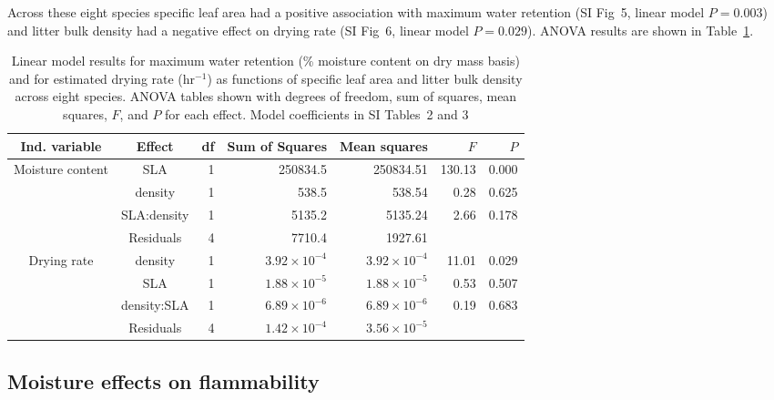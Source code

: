 \documentclass[letterpaper,12pt]{article}
\begin{document}
Across these eight species specific leaf area had a positive association with maximum
water retention (SI Fig~5, linear model $P = 0.003$) and litter
bulk density had a negative effect on drying rate (SI Fig~6,
linear model $P = 0.029$). ANOVA results are shown in Table~\ref{tab:mc_di_anova}.

\begin{table}[h]
  \caption{Linear model results for maximum water retention (\% moisture
    content on dry mass basis) and for estimated drying rate (hr$^{-1}$) as
    functions of specific leaf area and litter bulk density across eight
    species. ANOVA tables shown with degrees of freedom, sum of squares, mean
    squares, $F$, and $P$ for each effect. Model coefficients in SI Tables~2 and 3}
  \label{tab:mc_di_anova}
\centering

\begin{tabular}{ccrrrrr}
  \toprule
Ind. variable & Effect & df & Sum of Squares & Mean squares & $F$ & $P$ \\ 
  \midrule
Moisture content & SLA & 1 & 250834.5 & 250834.51 & 130.13 & 0.000 \\ 
  & density & 1 & 538.5 & 538.54 & 0.28 & 0.625 \\ 
  & SLA:density & 1 & 5135.2 & 5135.24 & 2.66 & 0.178 \\ 
  & Residuals & 4 & 7710.4 & 1927.61 &  &  \\ 
  \midrule
  
Drying rate & density & 1 & $3.92 \times 10^{-4}$ & $3.92 \times 10^{-4}$ & 11.01 & 0.029 \\ 
 &  SLA & 1 & $1.88 \times 10^{-5}$ & $1.88 \times 10^{-5}$ & 0.53 & 0.507 \\ 
 &  density:SLA & 1 & $6.89 \times 10^{-6}$ & $6.89 \times 10^{-6}$ & 0.19 & 0.683 \\ 
 &  Residuals & 4 & $1.42 \times 10^{-4}$ & $3.56 \times 10^{-5}$ &  &  \\ 
   \bottomrule

\end{tabular}
\end{table}


\subsection*{Moisture effects on flammability}
\end{document}
